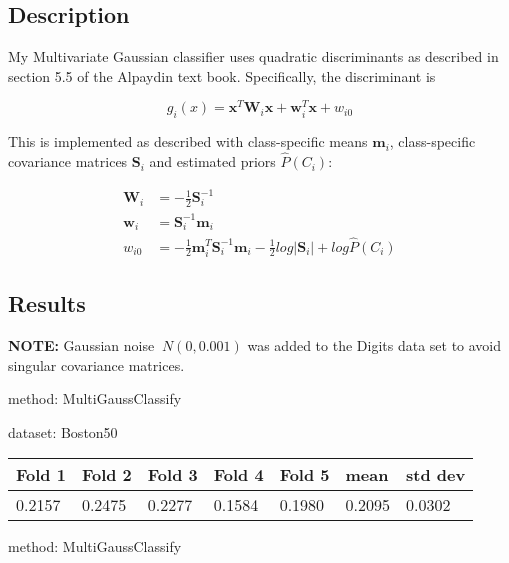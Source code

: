 \documentclass{article}
\begin{document}
\subsection{Description}

\noindent My Multivariate Gaussian classifier uses quadratic discriminants as described in section 5.5 of the Alpaydin text book.  Specifically, the discriminant is

\begin{equation}
g_i(x) = \textbf{x}^T \textbf{W}_i \textbf{x} + \textbf{w}_i^T \textbf{x} + w_{i0}
\end{equation}

\noindent This is implemented as described with class-specific means $\textbf{m}_i$, class-specific covariance matrices $\textbf{S}_i$ and estimated priors $\hat{P}(C_i)$:

\begin{equation}
\begin{aligned}
\textbf{W}_i &= - \frac{1}{2} \textbf{S}_i^{-1} \\
\textbf{w}_i  &= \textbf{S}_i^{-1} \textbf{m}_i \\
w_{i0}          &= - \frac{1}{2}\textbf{m}_i^T \textbf{S}_i^{-1} \textbf{m}_i - \frac{1}{2} log | \textbf{S}_i | + log \hat{P}(C_i)
\end{aligned}
\end{equation}

\subsection{Results}

\noindent \textbf{NOTE:} Gaussian noise $~ N(0, 0.001)$ was added to the Digits data set to avoid singular covariance matrices.

\hfill \break

\noindent method: MultiGaussClassify

\noindent dataset: Boston50

\begin{center}
	\begin{tabular}  { | l | l | l | l | l | l | l | }
	\hline
	Fold 1 & Fold 2 & Fold 3 & Fold 4 & Fold 5 & mean & std dev\\ \hline
	0.2157 & 0.2475 & 0.2277 & 0.1584 & 0.1980 & 0.2095 & 0.0302\\
	\hline
	\end{tabular}
\end{center}
\noindent method: MultiGaussClassify
\end{document}
